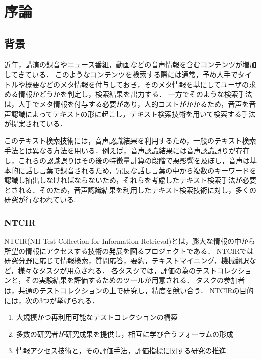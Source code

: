 ﻿

\chapter{序論} %
\section{背景}
近年，講演の録音やニュース番組，動画などの音声情報を含むコンテンツが増加してきている．
このようなコンテンツを検索する際には通常，予め人手でタイトルや概要などのメタ情報を付与しておき，そのメタ情報を基にしてユーザの求める情報かどうかを判定し，検索結果を出力する．
一方でそのような検索手法は，人手でメタ情報を付与する必要があり，人的コストがかかるため，音声を音声認識によってテキストの形に起こし，テキスト検索技術を用いて検索する手法が提案されている．

このテキスト検索技術には，音声認識結果を利用するため，一般のテキスト検索手法とは異なる方法を用いる．例えば，音声認識結果には音声認識誤りが存在し，これらの認識誤りはその後の特徴量計算の段階で悪影響を及ぼし，音声は基本的に話し言葉で録音されるため，冗長な話し言葉の中から複数のキーワードを認識し抽出しなければならないため，それらを考慮したテキスト検索手法が必要とされる．そのため，音声認識結果を利用したテキスト検索技術に対し，多くの研究が行なわれている. 

\subsection{NTCIR}
NTCIR(NII Test Collection for Information Retrieval)\cite{NTCIR}とは，膨大な情報の中から所望の情報にアクセスする技術の発展を図るプロジェクトである．
NTCIRでは研究分野に応じて情報検索，質問応答，要約，テキストマイニング，機械翻訳など，様々なタスクが用意される．
各タスクでは，評価の為のテストコレクションと，その実験結果を評価するためのツールが用意される．
タスクの参加者は，共通のテストコレクションの上で研究し，精度を競い合う．
NTCIRの目的には，次の3つが挙げられる．
\begin{enumerate}
    \item 大規模かつ再利用可能なテストコレクションの構築
    \item 多数の研究者が研究成果を提供し，相互に学び合うフォーラムの形成
    \item 情報アクセス技術と，その評価手法，評価指標に関する研究の推進
\end{enumerate}


